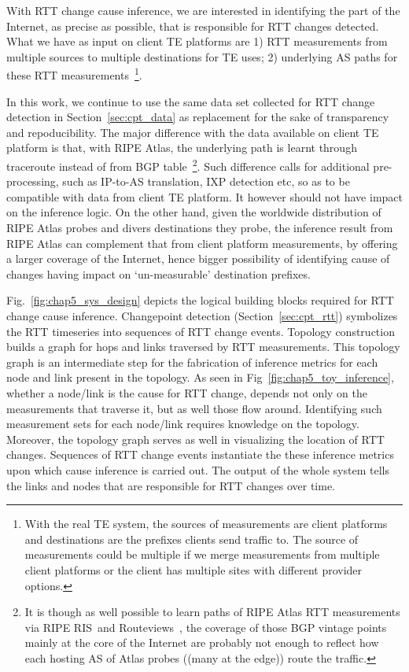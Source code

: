 With RTT change cause inference, we are interested in identifying the part of the Internet, as precise as possible, that is responsible for RTT changes detected. What we have as input on client TE platforms are 1) RTT measurements from multiple sources to multiple destinations for TE uses; 2) underlying AS paths for these RTT measurements~\footnote{With the real TE system, the sources of measurements are client platforms and destinations are the prefixes clients send traffic to. The source of measurements could be multiple if we merge measurements from multiple client platforms or the client has multiple sites with different provider options.}. 

In this work, we continue to use the same data set collected for RTT change detection in Section~\ref{sec:cpt_data} as replacement for the sake of transparency and repoducibility. The major difference with the data available on client TE platform is that, with RIPE Atlas, the underlying path is learnt through traceroute instead of from BGP table~\footnote{It is though as well possible to learn paths of RIPE Atlas RTT measurements via RIPE RIS~\cite{ris}and Routeviews~\cite{routeviews}, the coverage of those BGP vintage points mainly at the core of the Internet are probably not enough to reflect how each hosting AS of Atlas probes ((many at the edge)) route the traffic.}. 
Such difference calls for additional pre-processing, such as IP-to-AS translation, IXP detection etc, so as to be compatible with data from client TE platform. It however should not have impact on the inference logic. On the other hand, given the worldwide distribution of RIPE Atlas probes and divers destinations they probe, the inference result from RIPE Atlas can complement that from client platform measurements, by offering a larger coverage of the Internet, hence bigger possibility of identifying cause of changes having impact on `un-measurable' destination prefixes.

Fig.~\ref{fig:chap5_sys_design} depicts the logical building blocks required for RTT change cause inference. Changepoint detection (Section~\ref{sec:cpt_rtt}) symbolizes the RTT timeseries into sequences of RTT change events.
Topology construction builds a graph for hops and links traversed by RTT measurements.
This topology graph is an intermediate step for the fabrication of inference metrics for each node and link present in the topology. As seen in Fig~\ref{fig:chap5_toy_inference}, whether a node/link is the cause for RTT change, depends not only on the measurements that traverse it, but as well those flow around. Identifying such measurement sets for each node/link requires knowledge on the topology. Moreover, the topology graph serves as well in visualizing the location of RTT changes. 
Sequences of RTT change events instantiate the these inference metrics upon which cause inference is carried out.
The output of the whole system tells the links and nodes that are responsible for RTT changes over time.

